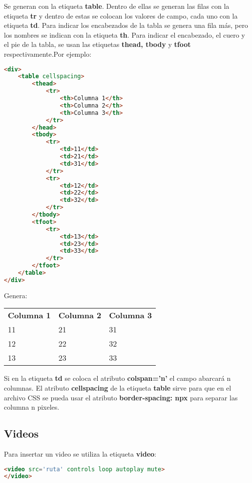 \documentclass[10pt,oneside]{article}
\begin{document}
\begin{multicols}{2}
    Se generan con la etiqueta \textbf{table}. Dentro de ellas se generan las filas con la etiqueta \textbf{tr} y dentro de estas se colocan los valores de campo, cada uno con la etiqueta \textbf{td}. Para indicar los encabezados de la tabla se genera una fila más, pero los nombres se indican con la etiqueta \textbf{th}. Para indicar el encabezado, el cuero y el pie de la tabla, se usan las etiquetas \textbf{thead, tbody} y \textbf{tfoot} respectivamente.Por ejemplo:
    
    \begin{lstlisting}[language=HTML]
<div>
    <table cellspacing>
        <thead>
            <tr>
                <th>Columna 1</th>
                <th>Columna 2</th>
                <th>Columna 3</th>
            </tr>
        </head>
        <tbody>
            <tr>
                <td>11</td>
                <td>21</td>
                <td>31</td>
            </tr>
            <tr>
                <td>12</td>
                <td>22</td>
                <td>32</td>
            </tr>
        </tbody>
        <tfoot>
            <tr>
                <td>13</td>
                <td>23</td>
                <td>33</td>
            </tr>
        </tfoot>
    </table>
</div>        
    \end{lstlisting}

    Genera: 
    \begin{center}
        \begin{tabular}{lll}
            \textbf{Columna 1} & \textbf{Columna 2} & \textbf{Columna 3} \\
            11 & 21 & 31 \\
            12 & 22 & 32 \\
            13 & 23 & 33           
        \end{tabular}
    \end{center}
    Si en la etiqueta \textbf{td} se coloca el atributo \textbf{colspan='n'} el campo abarcará n columnas. El atributo \textbf{cellspacing} de la etiqueta \textbf{table} sirve para que en el archivo CSS se pueda usar el atributo \textbf{border-spacing: npx} para separar las columna n pixeles.

\subsection{Videos}

    Para insertar un video se utiliza la etiqueta \textbf{video}:

    \begin{lstlisting}[language=HTML]
<video src='ruta' controls loop autoplay mute>
</video>       
    \end{lstlisting}


\end{multicols}
\end{document}
